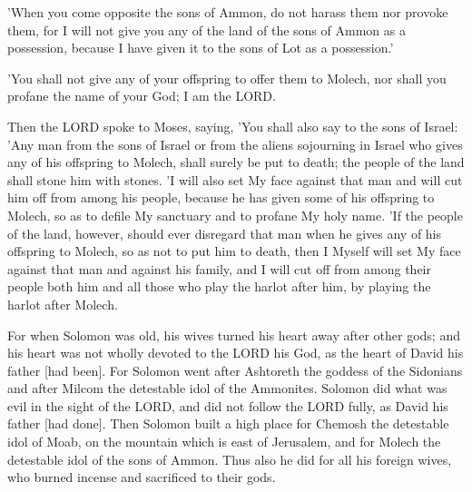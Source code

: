 \begin{scripture}[Deuteronomy 2:19]
    'When you come opposite the sons of Ammon, do not harass them nor provoke them, for I will not give you any of the land of the sons of Ammon as a possession, because I have given it to the sons of Lot as a possession.'
\end{scripture}

\begin{scripture}[Leviticus 18:21]
    'You shall not give any of your offspring to offer them to Molech, nor shall you profane the name of your God; I am the LORD.
\end{scripture}

\begin{scripture}[Leviticus 20:1-5]
    Then the LORD spoke to Moses, saying,
    'You shall also say to the sons of Israel: 'Any man from the sons of Israel or from the aliens sojourning in Israel who gives any of his offspring to Molech, shall surely be put to death; the people of the land shall stone him with stones.
    'I will also set My face against that man and will cut him off from among his people, because he has given some of his offspring to Molech, so as to defile My sanctuary and to profane My holy name.
    'If the people of the land, however, should ever disregard that man when he gives any of his offspring to Molech, so as not to put him to death,
    then I Myself will set My face against that man and against his family, and I will cut off from among their people both him and all those who play the harlot after him, by playing the harlot after Molech.
\end{scripture}

\begin{scripture}[1 Kings 11:4-8]
    For when Solomon was old, his wives turned his heart away after other gods; and his heart was not wholly devoted to the LORD his God, as the heart of David his father [had been].
    For Solomon went after Ashtoreth the goddess of the Sidonians and after Milcom the detestable idol of the Ammonites.
    Solomon did what was evil in the sight of the LORD, and did not follow the LORD fully, as David his father [had done].
    Then Solomon built a high place for Chemosh the detestable idol of Moab, on the mountain which is east of Jerusalem, and for Molech the detestable idol of the sons of Ammon.
    Thus also he did for all his foreign wives, who burned incense and sacrificed to their gods.
\end{scripture}

